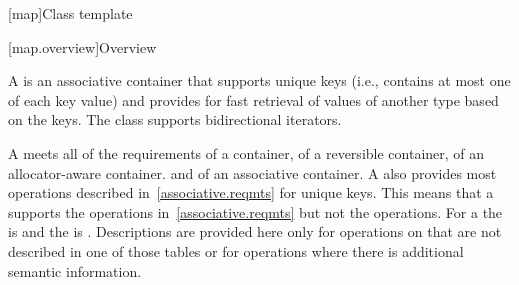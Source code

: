 [map]{Class template }

[map.overview]{Overview}

%
\pnum
A  is an associative container that
supports unique keys (i.e., contains at most one of each key value) and
provides for fast retrieval of values of another type  based
on the keys. The  class supports bidirectional iterators.

\pnum
A  meets all of the requirements of
a container,
of a reversible container,
of an allocator-aware container. and
of an associative container.
A
also provides most operations described in~\ref{associative.reqmts}
for unique keys.
This means that a
supports the
operations in~\ref{associative.reqmts}
but not the
operations.
For a
the
is
and the
is
.
Descriptions are provided here only for operations on
that are not described in one of those tables
or for operations where there is additional semantic information.

